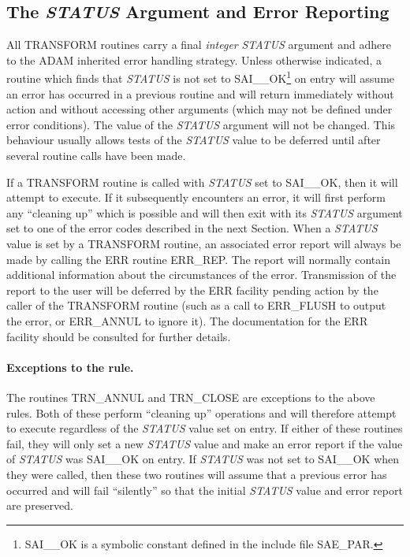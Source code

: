 \documentclass[twoside,11pt]{article}
\newcommand{\xlabel}[1]{}
\newcommand{\name}[1]{\mbox{\small{#1}}}
\newcommand{\fortvar}[1]{\mbox{\emph{#1}}}
\begin{document}
\label{appendix:error}


\subsection{\xlabel{the_status_argument_and_error_reporting}%
The \fortvar{STATUS} Argument and Error Reporting}

All \name{TRANSFORM} routines carry a final \emph{integer} \fortvar{STATUS}
argument and adhere to the \name{ADAM} inherited error handling strategy. 
Unless otherwise indicated, a routine which finds that \fortvar{STATUS} is
not set to \name{SAI\_\_OK}\footnote{
\name{SAI\_\_OK} is a symbolic constant defined in the include file 
\name{SAE\_PAR}.
}
on entry will assume an error has occurred in a previous routine and will
return immediately without action and without accessing other arguments
(which may not be defined under error conditions). 
The value of the \fortvar{STATUS} argument will not be changed.
This behaviour usually allows tests of the \fortvar{STATUS} value to be
deferred until after several routine calls have been made. 

If a \name{TRANSFORM} routine is called with \fortvar{STATUS} set to 
\name{SAI\_\_OK}, then it will attempt to execute.
If it subsequently encounters an error, it will first perform any ``cleaning
up'' which is possible and will then exit with its \fortvar{STATUS} argument
set to one of the error codes described in the next Section.
When a \fortvar{STATUS} value is set by a \name{TRANSFORM} routine, an
associated error report will always be made by calling the \name{ERR}
routine \name{ERR\_REP}. 
The report will normally contain additional information about the
circumstances of the error. 
Transmission of the report to the user will be deferred by the \name{ERR}
facility pending action by the caller of the \name{TRANSFORM} routine
(such as a call to \name{ERR\_FLUSH} to output the error, or
\name{ERR\_ANNUL} to ignore it).
The documentation for the \name{ERR} facility should be consulted for
further details. 

\paragraph{Exceptions to the rule.}
The routines \name{TRN\_ANNUL} and \name{TRN\_CLOSE} are exceptions to the 
above rules.
Both of these perform ``cleaning up'' operations and will therefore attempt
to execute regardless of the \fortvar{STATUS} value set on entry. 
If either of these routines fail, they will only set a new \fortvar{STATUS}
value and make an error report if the value of \fortvar{STATUS} was
\name{SAI\_\_OK} on entry. 
If \fortvar{STATUS} was not set to \name{SAI\_\_OK} when they were called,
then these two routines will assume that a previous error has occurred and
will fail ``silently'' so that the initial \fortvar{STATUS} value and error
report are preserved. 
\end{document}
